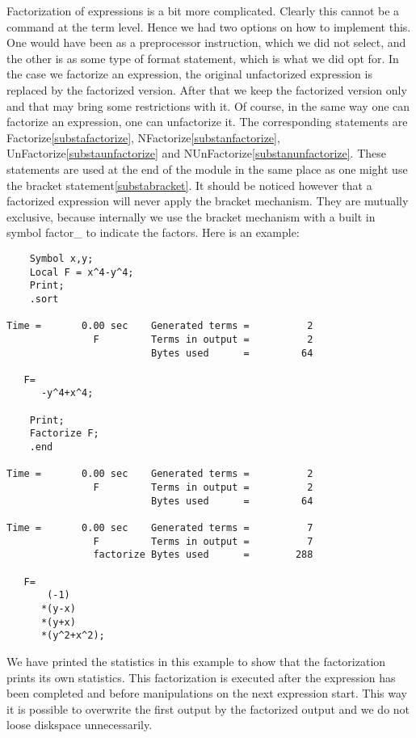 \noindent Factorization of expressions is a bit more complicated. Clearly 
this cannot be a command at the term level. Hence we had two options on how 
to implement this. One would have been as a preprocessor instruction, which 
we did not select, and the other is as some type of format statement, which 
is what we did opt for. In the case we factorize an expression, the 
original unfactorized expression is replaced by the factorized version. 
After that we keep the factorized version only and that may bring some 
restrictions with it. Of course, in the same way one can factorize an 
expression, one can unfactorize it. The corresponding statements are 
Factorize\ref{substafactorize}, NFactorize\ref{substanfactorize}, 
UnFactorize\ref{substaunfactorize} and 
NUnFactorize\ref{substanunfactorize}. These statements are used at the end 
of the module in the same place as one might use the bracket 
statement\ref{substabracket}. It should be noticed however that a 
factorized expression will never apply the bracket mechanism. They are 
mutually exclusive, because internally we use the bracket mechanism with a 
built in symbol factor\_ to indicate the factors. Here is an example:
\begin{verbatim}
    Symbol x,y;
    Local F = x^4-y^4;
    Print;
    .sort

Time =       0.00 sec    Generated terms =          2
               F         Terms in output =          2
                         Bytes used      =         64

   F=
      -y^4+x^4;

    Print;
    Factorize F;
    .end

Time =       0.00 sec    Generated terms =          2
               F         Terms in output =          2
                         Bytes used      =         64

Time =       0.00 sec    Generated terms =          7
               F         Terms in output =          7
               factorize Bytes used      =        288

   F=
       (-1)
      *(y-x)
      *(y+x)
      *(y^2+x^2);
\end{verbatim}
We have printed the statistics in this example to show that the 
factorization prints its own statistics. This factorization is executed 
after the expression has been completed and before manipulations on the 
next expression start. This way it is possible to overwrite the first 
output by the factorized output and we do not loose diskspace 
unnecessarily.

